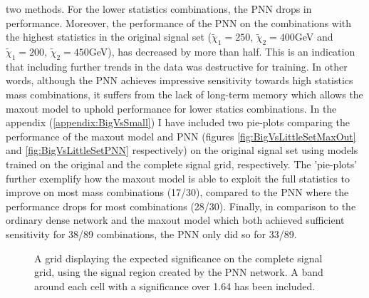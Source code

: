 two methods. For the lower statistics combinations, the \ac{PNN} drops in performance. Moreover, the performance of the \ac{PNN} on the combinations with the highest 
statistics in the original signal set ($\tilde{\chi}_1=250$, $\tilde{\chi}_2=400$GeV and $\tilde{\chi}_1=200$, $\tilde{\chi}_2=450$GeV), has decreased by more than half.
This is an indication that including further trends in the data was destructive for training. In other words, although the \ac{PNN} achieves impressive sensitivity towards high 
statistics mass combinations, it suffers from the lack of long-term memory which allows the maxout model to uphold performance for lower statics combinations. In the appendix 
(\ref{appendix:BigVsSmall}) I have included two pie-plots comparing the performance of the maxout model and \ac{PNN} (figures \ref{fig:BigVsLittleSetMaxOut} and \ref{fig:BigVsLittleSetPNN} 
respectively) on the original signal set using models trained on the original and the complete signal grid, respectively. The 'pie-plots' further exemplify how the maxout model is able to exploit 
the full statistics to improve on most mass combinations (17/30), compared to the \ac{PNN} where the performance drops for most combinations (28/30). Finally, in comparison to the ordinary 
dense network and the maxout model which both achieved sufficient sensitivity for 38/89 combinations, the \ac{PNN} only did so for 33/89.\\
\begin{figure}
    \caption{A grid displaying the expected significance on the complete signal grid, using the signal region 
    created by the \acs{PNN} network. A band around each cell with a significance over 1.64 has been included.}
    \label{fig:PNNPCA_FS_MLMGridSig}
\end{figure}
